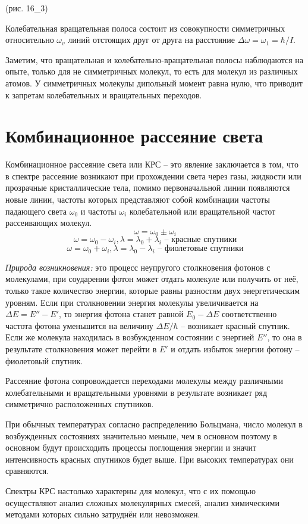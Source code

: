 (рис. 16_3)

Колебательная вращательная полоса состоит из совокупности симметричных 
относительно \( \omega_v \) линий отстоящих друг от друга на расстояние 
\( \Delta\omega = \omega_1 = \hbar/I \).

Заметим, что вращательная и колебательно-вращательная полосы наблюдаются 
на опыте, только для не симметричных молекул, то есть для молекул из 
различных атомов. У симметричных молекулы дипольный момент равна нулю, 
что приводит к запретам колебательных и вращательных переходов.

\section{Комбинационное рассеяние света}
Комбинационное рассеяние света или КРС -- это явление заключается в том, 
что в спектре рассеяние возникают при прохождении света через газы, 
жидкости или прозрачные кристаллические тела, помимо первоначальной линии 
появляются новые линии, частоты которых представляют собой комбинации 
частоты падающего света \( \omega_0 \) и частоты \( \omega_i \) 
колебательной или вращательной частот рассеивающих молекул.
\[ \omega = \omega_0 \pm \omega_i \]
\[ 
    \omega = \omega_0 - \omega_i, \lambda = \lambda_0 + \lambda_i 
    \text{ -- красные спутники}
\]
\[ 
    \omega = \omega_0 + \omega_i, \lambda = \lambda_0 - \lambda_i
    \text{ -- фиолетовые спутники}
\]

\emph{Природа возникновения: } это процесс неупругого столкновения фотонов 
с молекулами, при соударении фотон может отдать молекуле или получить от 
неё, только такое количество энергии, которые равны разностям двух 
энергетическим уровням. Если при столкновении энергия молекулы 
увеличивается на \( \Delta E = E'' - E' \), то энергия фотона станет 
равной \( E_0 - \Delta E \) соответственно частота фотона уменьшится на 
величину \( \Delta E / \hbar \) -- возникает красный спутник. Если же 
молекула находилась в возбужденном состоянии с энергией \( E'' \), то 
она в результате столкновения может перейти в \( E' \) и отдать избыток 
энергии фотону -- фиолетовый спутник.

Рассеяние фотона сопровождается переходами молекулы между различными 
колебательными и вращательными уровнями в результате возникает ряд 
симметрично расположенных спутников. 

При обычных температурах согласно распределению Больцмана, число молекул 
в возбужденных состояниях значительно меньше, чем в основном поэтому в 
основном будут происходить процессы поглощения энергии и значит 
интенсивность красных спутников будет выше. При высоких температурах 
они сравняются.

Спектры КРС настолько характерны для молекул, что с их помощью осуществляют 
анализ сложных молекулярных смесей, анализ химическими методами 
которых сильно затруднён или невозможен.


\newpage
